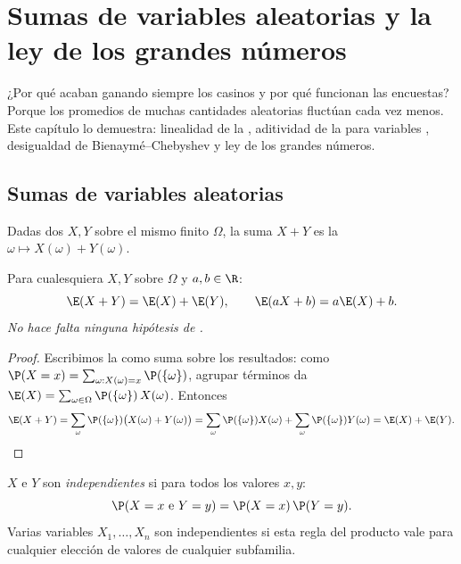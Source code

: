 \chapter{Sumas de variables aleatorias y la ley de los grandes números}\label{ch:g12:sums}

¿Por qué acaban ganando siempre los casinos y por qué funcionan las
encuestas? Porque los promedios de muchas cantidades aleatorias
 fluctúan cada vez menos. Este capítulo lo demuestra:
linealidad de la , aditividad de la  para variables
, desigualdad de Bienaymé--Chebyshev y ley de los grandes
números.

\section{Sumas de variables aleatorias}

Dadas dos  $X, Y$ sobre el mismo 
finito $\Omega$, la suma $X + Y$ es la 
$\omega \mapsto X(\omega) + Y(\omega)$.

\begin{theorem}\label{thm:g12:sums:linearity}
Para cualesquiera  $X, Y$ sobre $\Omega$ y
$a, b \in \R$:
\[
\E(X + Y) = \E(X) + \E(Y), \qquad \E(aX + b) = a\E(X) + b .
\]
\emph{No hace falta ninguna hipótesis de .}
\end{theorem}

\begin{proof}
Escribimos la  como suma sobre los resultados: como
$\P(X = x) = \sum_{\omega : X(\omega) = x} \P(\{\omega\})$, agrupar
términos da $\E(X) = \sum_{\omega \in \Omega} \P(\{\omega\})\,X(\omega)$.
Entonces
\[
\E(X + Y) = \sum_{\omega} \P(\{\omega\})\bigl(X(\omega) + Y(\omega)\bigr)
= \sum_{\omega} \P(\{\omega\})X(\omega)
+ \sum_{\omega} \P(\{\omega\})Y(\omega) = \E(X) + \E(Y). \qedhere
\]
\end{proof}

\begin{definition}\label{def:g12:sums:indep}
$X$ e $Y$ son \emph{independientes}
si para todos los valores $x, y$:
\[
\P(X = x \text{ e } Y = y) = \P(X = x)\,\P(Y = y).
\]
Varias variables $X_1, \dots, X_n$ son independientes si esta regla del
producto vale para cualquier elección de valores de cualquier subfamilia.
\end{definition}


